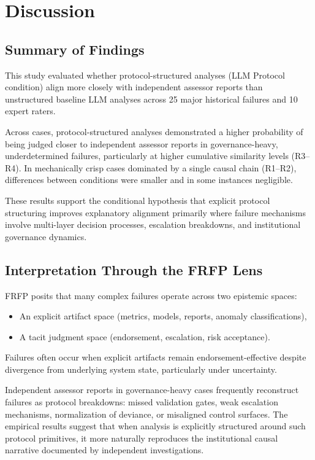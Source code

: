 \section{Discussion}
\label{sec:discussion}

\subsection{Summary of Findings}

This study evaluated whether protocol-structured analyses (LLM Protocol condition) align more closely with independent assessor reports than unstructured baseline LLM analyses across 25 major historical failures and 10 expert raters.

Across cases, protocol-structured analyses demonstrated a higher probability of being judged closer to independent assessor reports in governance-heavy, underdetermined failures, particularly at higher cumulative similarity levels (R3--R4). In mechanically crisp cases dominated by a single causal chain (R1--R2), differences between conditions were smaller and in some instances negligible.

These results support the conditional hypothesis that explicit protocol structuring improves explanatory alignment primarily where failure mechanisms involve multi-layer decision processes, escalation breakdowns, and institutional governance dynamics.

\subsection{Interpretation Through the FRFP Lens}

FRFP posits that many complex failures operate across two epistemic spaces:
\begin{itemize}
    \item An explicit artifact space (metrics, models, reports, anomaly classifications),
    \item A tacit judgment space (endorsement, escalation, risk acceptance).
\end{itemize}

Failures often occur when explicit artifacts remain endorsement-effective despite divergence from underlying system state, particularly under uncertainty.

Independent assessor reports in governance-heavy cases frequently reconstruct failures as protocol breakdowns: missed validation gates, weak escalation mechanisms, normalization of deviance, or misaligned control surfaces. The empirical results suggest that when analysis is explicitly structured around such protocol primitives, it more naturally reproduces the institutional causal narrative documented by independent investigations.


